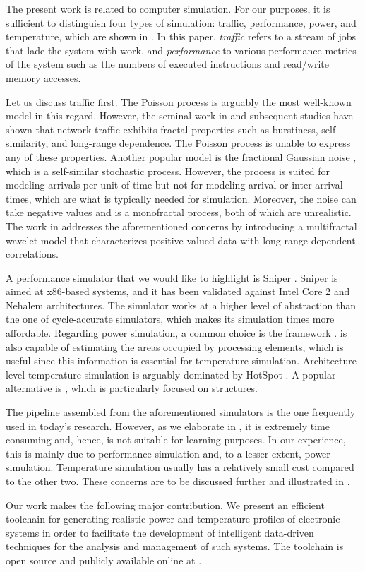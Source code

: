 The present work is related to computer simulation. For our purposes, it is
sufficient to distinguish four types of simulation: traffic, performance, power,
and temperature, which are shown in . In this paper,
\emph{traffic} refers to a stream of jobs that lade the system with work, and
\emph{performance} to various performance metrics of the system such as the
numbers of executed instructions and read/write memory accesses.

Let us discuss traffic first. The Poisson process \cite{lifshits2014} is
arguably the most well-known model in this regard. However, the seminal work in
\cite{leland1994} and subsequent studies have shown that network traffic
exhibits fractal properties such as burstiness, self-similarity, and long-range
dependence. The Poisson process is unable to express any of these properties.
Another popular model is the fractional Gaussian noise \cite{lifshits2014},
which is a self-similar stochastic process. However, the process is suited for
modeling arrivals per unit of time but not for modeling arrival or inter-arrival
times, which are what is typically needed for simulation. Moreover, the noise
can take negative values and is a monofractal process, both of which are
unrealistic. The work in \cite{riedi1999} addresses the aforementioned concerns
by introducing a multifractal wavelet model that characterizes positive-valued
data with long-range-dependent correlations.

A performance simulator that we would like to highlight is Sniper
\cite{carlson2011}. Sniper is aimed at x86-based systems, and it has been
validated against Intel Core 2 and Nehalem architectures. The simulator works at
a higher level of abstraction than the one of cycle-accurate simulators, which
makes its simulation times more affordable. Regarding power simulation, a common
choice is the  framework \cite{li2009}.  is also capable of
estimating the areas occupied by processing elements, which is useful since this
information is essential for temperature simulation. Architecture-level
temperature simulation is arguably dominated by HotSpot \cite{skadron2004}. A
popular alternative is  \cite{sridhar2010}, which is particularly
focused on  structures.

The pipeline assembled from the aforementioned simulators is the one frequently
used in today's research. However, as we elaborate in , it is
extremely time consuming and, hence, is not suitable for learning purposes. In
our experience, this is mainly due to performance simulation and, to a lesser
extent, power simulation. Temperature simulation usually has a relatively small
cost compared to the other two. These concerns are to be discussed further and
illustrated in .

Our work makes the following major contribution. We present an efficient
toolchain for generating realistic power and temperature profiles of electronic
systems in order to facilitate the development of intelligent data-driven
techniques for the analysis and management of such systems. The toolchain is
open source and publicly available online at \cite{sources}.

